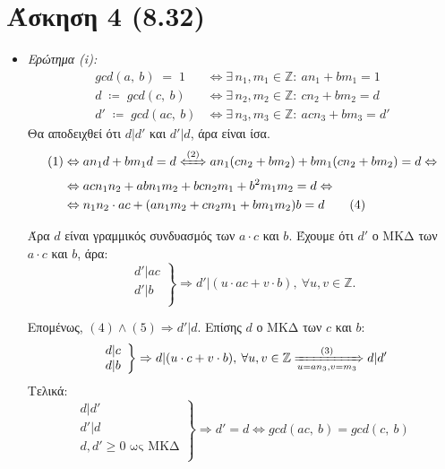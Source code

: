 \documentclass[12pt]{article}
\newcommand{\lt}{\latintext}
\newcommand{\ints}{\mathbb{Z}}
\begin{document}
\pagebreak

\section*{Άσκηση 4 (8.32)}
\begin{itemize}
\item \textit{Ερώτημα ({\lt i}):}
\begin{align*}
	gcd(a,\:b)\;=\; 1 &\Leftrightarrow \exists\, n_1, m_1 \in \ints :\: an_1 + bm_1 = 1 \tag{1} \\
	d \;\coloneqq\; gcd(c,\:b) &\Leftrightarrow \exists\, n_2, m_2 \in \ints:\: cn_2 + bm_2 = d \tag{2} \\ 
	d' \;\coloneqq\; gcd(ac,\:b) &\Leftrightarrow \exists\, n_3, m_3 \in \ints:\: acn_3 + bm_3 = d' \tag{3}
\end{align*}
\noindent
Θα αποδειχθεί ότι $d | d'$ και $d' | d$, άρα είναι ίσα.
\begin{align*}
	(1) &\Leftrightarrow an_1d + bm_1d = d \xLeftrightarrow{(2)} an_1(cn_2 + bm_2) + bm_1(cn_2 + bm_2) = d \Leftrightarrow \\
	&\Leftrightarrow acn_1n_2 + abn_1m_2 + bcn_2m_1 + b^2m_1m_2 = d \Leftrightarrow \\
	&\Leftrightarrow n_1n_2 \cdot ac + (an_1m_2 + cn_2m_1 + bm_1m_2)b = d \tag{4}
\end{align*}

\hfill

\noindent
Άρα $d$ είναι γραμμικός συνδυασμός των $a \cdot c$ και $b$. 
Έχουμε ότι $d'$ ο ΜΚΔ των $a \cdot c$ και $b$, άρα: 
\[
	\left.\begin{array}{l}
	d' | ac \\
	d' | b	\\
	\end{array}
	\right\} \Rightarrow d' | (u \cdot ac + v \cdot b),\: \forall u, v \in \mathbb{Z}. \tag{5}
\]

Επομένως, $(4) \wedge (5) \Rightarrow d' | d$. Επίσης $d$ ο ΜΚΔ των $c$ και $b$:
\[
	\left.\begin{array}{l}
	d | c 	\\
	d | b	\\
	\end{array}
	\right\} \Rightarrow d | (u \cdot c + v \cdot b),\: \forall u, v \in \mathbb{Z} \xRightarrow[u = an_3, v = m_3]{(3)} d | d'
\]
Τελικά:
\[
	\left.\begin{array}{l}
	d | d' \\
	d' | d \\
	d, d' \geq 0 \text{  ως ΜΚΔ} \\ 
	\end{array}
	\right\} \Rightarrow d' = d \Leftrightarrow gcd(ac,\:b) = gcd(c,\:b)
\]


\end{itemize}
\end{document}
